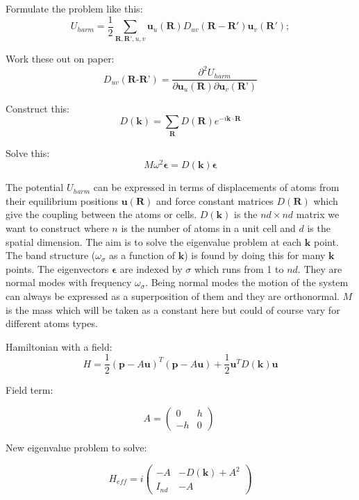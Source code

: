 \documentclass[a5paper,12pt]{article}
\begin{document}

Formulate the problem like this:
\begin{equation}
U_{harm}=\frac{1}{2}\sum_ {\mathbf{R,R'},u,v}^{}\mathbf{u}_u(\mathbf{R})D_{uv}(\mathbf{R-R'})\mathbf{u}_v(\mathbf{R'}); \label{U}
\end{equation}

Work these out on paper:
\begin{equation}
D_{uv} (\textbf{R-R'})=\frac{\partial^2 U_{harm}}{\partial \textbf{u}_u(\textbf{R}) \partial \textbf{u}_v(\textbf{R'})}
\end{equation}

Construct this:
\begin{equation}
D(\mathbf{k})=\sum_{\textbf{R}} D(\mathbf{ R})e^{-i\mathbf{k} \cdot \mathbf{R}}
\end{equation}

Solve this:
\begin{equation}
M \omega^{2} \mathbf{\epsilon} = D(\mathbf{k})
\mathbf{\epsilon}
\end{equation}

\vspace{1cm}
\noindent The potential $U_{harm}$ can be expressed in terms of displacements of atoms from their equilibrium positions $\textbf{u}(\textbf{R})$ and force constant matrices $D(\mathbf{R})$ which give the coupling between the atoms or cells. \noindent $D(\mathbf{k})$ is the $nd\times nd$ matrix we want to construct where $n$ is the number of atoms in a unit cell and $d$ is the spatial dimension. The aim is to solve the eigenvalue problem at each $\mathbf{k}$ point. The band structure ($\omega_\sigma$ as a function of $\mathbf{k}$) is found by doing this for many $\mathbf{k}$ points. The eigenvectors $\mathbf{\epsilon}$ are indexed by $\sigma$ which runs from 1 to $nd$. They are normal modes with frequency $\omega_\sigma$. Being normal modes the motion of the system can always be expressed as a superposition of them and they are orthonormal. $M$ is the mass which will be taken as a constant here but could of course vary for different atoms types.

\newpage

Hamiltonian with a field:
\begin{equation}
H  = \frac{1}{2} (\mathbf{p}-{ A } \mathbf{u})^T (\mathbf{p}-{ A }\mathbf{u}) + \frac{1}{2} \mathbf{u}^T D(\mathbf{k}) \mathbf{u}
\end{equation}

Field term:

\begin{equation} 
A =\left( \begin{array}{cc} 0 & h \\ 
-h & 0 \end{array} \right)\;
\end{equation}



New eigenvalue problem to solve:

\begin{equation}
H_{eff}= i\left( \begin{array}{cc} -A & -D(\mathbf{k}) + A^2 \\
I_{nd} & -A \end{array} \right)
\end{equation}
\end{document}
